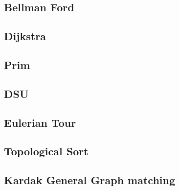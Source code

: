 \documentclass[a4paper,landscape]{article}
\begin{document}
\begin{multicols}{2}
\subsection{Bellman Ford}
	
\subsection{Dijkstra}
	
\subsection{Prim}
	
\subsection{DSU}
	
\subsection{Eulerian Tour}
	
\subsection{Topological Sort}
	
\subsection{Kardak General Graph matching}
	

\end{multicols}
\end{document}
